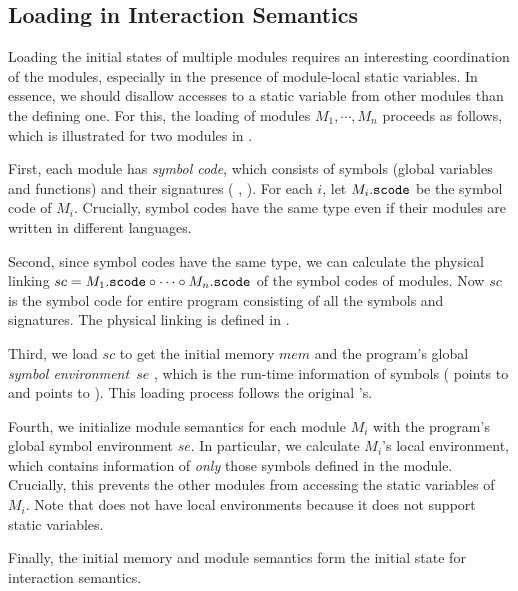 \subsection{Loading in Interaction Semantics}
\label{sec:main-semantics:loading}



Loading the initial states of multiple modules requires an interesting
coordination of the modules, especially in the presence of module-local static variables.  In essence, we
should disallow accesses to a static variable from other modules than the defining one.  For
this, the loading of modules $M_1, \cdots, M_n$ proceeds as follows, which is illustrated for two
modules in .

First, each module has \emph{symbol code}, which consists of symbols (\ie global variables and functions) and their
signatures (\eg{} , ).  For each $i$, let $M_i.\texttt{scode}$ be the
symbol code of $M_i$.  Crucially, symbol codes have the same type even if their modules are written
in different languages.

Second, since symbol codes have the same type, we can calculate the physical linking
$sc = M_1.\texttt{scode} \circ \cdots \circ M_n.\texttt{scode}$ of the symbol codes of modules.  Now
$sc$ is the symbol code for entire program consisting of all the symbols and signatures.  The
physical linking is defined in \cite{kang:scc}.

Third, we load $sc$ to get the initial memory $mem$ 
and the program's global \emph{symbol environment}~$se$ ,
which is the run-time information of symbols (\eg{}  points to
 and  points to ).  This loading process follows the original \cc{}'s.

Fourth, we initialize module semantics for each module $M_i$ with the program's global symbol
environment $se$.  In particular, we calculate $M_i$'s local environment, which contains information
of \emph{only} those symbols defined in the module.  Crucially, this prevents the other modules from
accessing the static variables of $M_i$. Note that \ccc{} does not have local environments because it does not support static variables.

Finally, the initial memory and module semantics form the initial state for interaction semantics.


